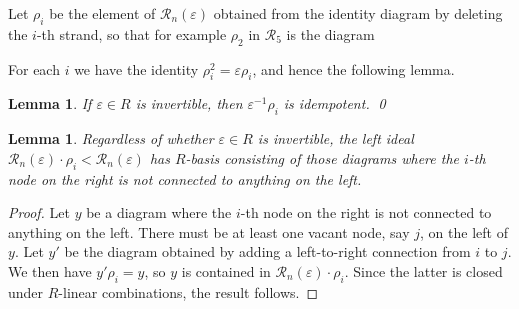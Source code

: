 \documentclass[12pt]{amsart}
\newlength{\nodeheight}
\newlength{\nodewidth}
\theoremstyle{plain}
\theoremstyle{definition} \newtheorem{definition}[theorem]{Definition}
\theoremstyle{plain}
\newtheorem{lemma}[theorem]{Lemma}
\theoremstyle{plain} \newtheorem{proposition}[theorem]{Proposition}
\theoremstyle{plain} \newtheorem{conjecture}[theorem]{Conjecture}
\theoremstyle{plain} \newtheorem{corollary}[theorem]{Corollary}
\theoremstyle{remark} \newtheorem{claim}[theorem]{Claim}
\theoremstyle{remark} \newtheorem{remark}[theorem]{Remark}
\theoremstyle{remark} \newtheorem{example}[theorem]{Example}
\theoremstyle{remark} \newtheorem{comment}[theorem]{Comment}
\theoremstyle{definition} \newtheorem{question}[theorem]{Question}
\newcommand{\rook}{\mathcal{R}}
\begin{document}
Let $\rho_i$ be the element of $\rook_n(\varepsilon)$ obtained from the identity diagram by deleting the $i$-th strand, so that for example $\rho_2$ in $\rook_5$ is the diagram
\begin{center}
\end{center}

For each $i$ we have the identity $\rho_i^2= \varepsilon \rho_i$, and hence the following lemma.

\begin{lemma} If $\varepsilon \in R$ is invertible, then $\varepsilon^{-1} \rho_i$ is idempotent. \qed \label{invertibleVarepsilon}
\end{lemma}

\begin{lemma} \label{myFirstIdeal} Regardless of whether $\varepsilon \in R$ is invertible, the left ideal $\rook_n(\varepsilon) \cdot \rho_i < \rook_n(\varepsilon)$ has $R$-basis consisting of those diagrams where the $i$-th node on the right is not connected to anything on the left. \end{lemma}

\begin{proof} Let $y$ be a diagram where the $i$-th node on the right is not connected to anything on the left. There must be at least one vacant node, say $j$, on the left of $y$. Let $y'$ be the diagram obtained by adding a left-to-right connection from $i$ to $j$. We then have $y' \rho_i = y$, so $y$ is contained in $\rook_n(\varepsilon) \cdot \rho_i$. Since the latter is closed under $R$-linear combinations, the result follows. \end{proof}
\end{document}
